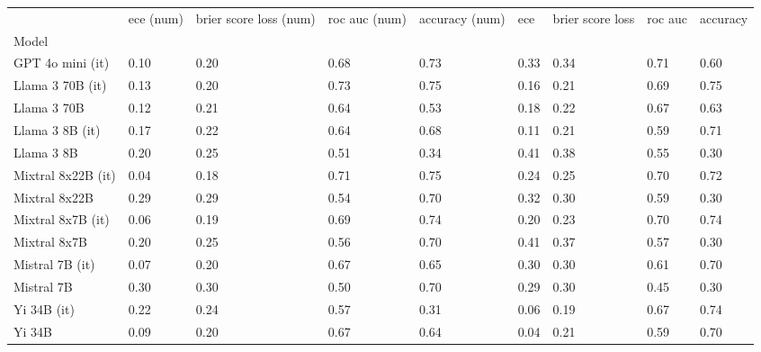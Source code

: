 \begin{tabular}{lllllllll}
\toprule
 & ece (num) & brier score loss (num) & roc auc (num) & accuracy (num) & ece & brier score loss & roc auc & accuracy \\
Model &  &  &  &  &  &  &  &  \\
\midrule
GPT 4o mini (it) & 0.10 & 0.20 & 0.68 & \cellcolor{cyan!17.6} 0.73 & 0.33 & 0.34 & \cellcolor{cyan!25.0} 0.71 & 0.60 \\
Llama 3 70B (it) & 0.13 & 0.20 & \cellcolor{cyan!25.0} 0.73 & \cellcolor{cyan!24.4} 0.75 & 0.16 & \cellcolor{cyan!16.2} 0.21 & \cellcolor{cyan!7.0} 0.69 & \cellcolor{cyan!25.0} 0.75 \\
Llama 3 70B & 0.12 & 0.21 & 0.64 & 0.53 & 0.18 & \cellcolor{cyan!8.3} 0.22 & 0.67 & 0.63 \\
Llama 3 8B (it) & 0.17 & 0.22 & 0.64 & 0.68 & 0.11 & \cellcolor{cyan!12.7} 0.21 & 0.59 & \cellcolor{cyan!7.7} 0.71 \\
Llama 3 8B & 0.20 & 0.25 & 0.51 & \cellcolor{orange!6.2} 0.34 & 0.41 & 0.38 & 0.55 & \cellcolor{orange!25.0} 0.30 \\
Mixtral 8x22B (it) & \cellcolor{cyan!25.0} 0.04 & \cellcolor{cyan!25.0} 0.18 & \cellcolor{cyan!11.0} 0.71 & \cellcolor{cyan!25.0} 0.75 & 0.24 & 0.25 & \cellcolor{cyan!11.7} 0.70 & \cellcolor{cyan!12.7} 0.72 \\
Mixtral 8x22B & \cellcolor{orange!15.5} 0.29 & \cellcolor{orange!3.4} 0.29 & 0.54 & \cellcolor{cyan!0.5} 0.70 & 0.32 & 0.30 & 0.59 & \cellcolor{orange!25.0} 0.30 \\
Mixtral 8x7B (it) & \cellcolor{cyan!0.3} 0.06 & \cellcolor{cyan!18.5} 0.19 & 0.69 & \cellcolor{cyan!22.2} 0.74 & 0.20 & \cellcolor{cyan!7.4} 0.23 & \cellcolor{cyan!12.7} 0.70 & \cellcolor{cyan!23.3} 0.74 \\
Mixtral 8x7B & 0.20 & 0.25 & 0.56 & 0.70 & 0.41 & 0.37 & 0.57 & \cellcolor{orange!25.0} 0.30 \\
Mistral 7B (it) & 0.07 & 0.20 & 0.67 & 0.65 & 0.30 & 0.30 & 0.61 & \cellcolor{cyan!0.4} 0.70 \\
Mistral 7B & \cellcolor{orange!22.1} 0.30 & \cellcolor{orange!18.5} 0.30 & 0.50 & 0.70 & 0.29 & 0.30 & \cellcolor{orange!25.0} 0.45 & \cellcolor{orange!25.0} 0.30 \\
Yi 34B (it) & 0.22 & 0.24 & 0.57 & \cellcolor{orange!25.0} 0.31 & \cellcolor{cyan!16.7} 0.06 & \cellcolor{cyan!25.0} 0.19 & 0.67 & \cellcolor{cyan!19.4} 0.74 \\
Yi 34B & 0.09 & 0.20 & 0.67 & 0.64 & \cellcolor{cyan!25.0} 0.04 & \cellcolor{cyan!17.2} 0.21 & 0.59 & \cellcolor{cyan!2.1} 0.70 \\

\end{tabular}
